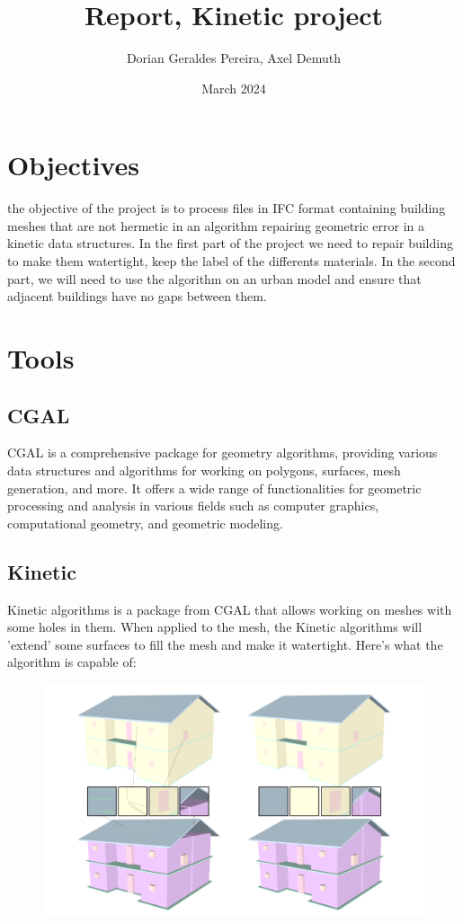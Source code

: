 \documentclass{article}
\title{Report, Kinetic project}
\author{Dorian Geraldes Pereira, Axel Demuth}
\date{March 2024}
\begin{document}
\maketitle
\tableofcontents
\newpage
\section{Objectives}
the objective of the project is to process files in IFC format containing building meshes that are not hermetic in an algorithm repairing
geometric error in a kinetic data structures.
\newline In the first part of the project we need to repair building to make them watertight, keep the label of the differents materials.
In the second part, we will need to use the algorithm on an urban model and ensure that adjacent buildings have no gaps between them. 
\section{Tools}
\subsection{CGAL}
CGAL is a comprehensive package for geometry algorithms, providing various data structures and algorithms for working on polygons, surfaces, mesh generation, and more.
It offers a wide range of functionalities for geometric processing and analysis in various fields such as computer graphics, computational geometry, and geometric modeling.
\subsection{Kinetic}

Kinetic algorithms is a package from CGAL that allows working on meshes with some holes in them. When applied to the mesh, the Kinetic algorithms will 'extend' some surfaces to fill the mesh and make it watertight. 
Here's what the algorithm is capable of:


\begin{figure}[h]
    
\includegraphics[scale =   0.3 ]{../../images/example_algorithm.png}

\end{figure}
\end{document}
